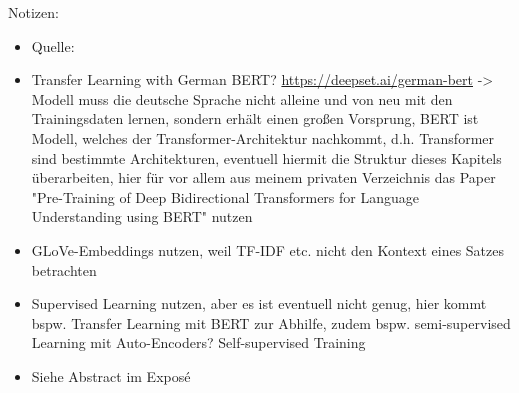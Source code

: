 Notizen:
\begin{itemize}
	\item Quelle: \cite{NIT19}
	\item Transfer Learning with German BERT? \url{https://deepset.ai/german-bert} -> Modell muss die deutsche Sprache nicht alleine und von neu  mit den Trainingsdaten lernen, sondern erhält einen großen Vorsprung, BERT ist Modell, welches der Transformer-Architektur nachkommt, d.h. Transformer sind bestimmte Architekturen, eventuell hiermit die Struktur dieses Kapitels überarbeiten, hier für vor allem aus meinem privaten Verzeichnis das Paper "Pre-Training of Deep Bidirectional Transformers for Language Understanding using BERT" nutzen
	\item GLoVe-Embeddings nutzen, weil TF-IDF etc. nicht den Kontext eines Satzes betrachten
	\item Supervised Learning nutzen, aber es ist eventuell nicht genug, hier kommt bspw. Transfer Learning mit BERT zur Abhilfe, zudem bspw. semi-supervised Learning mit Auto-Encoders? Self-supervised Training
	\item Siehe Abstract im Exposé
\end{itemize}
